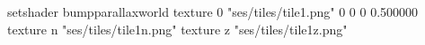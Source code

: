 setshader bumpparallaxworld
texture 0 "ses/tiles/tile1.png" 0 0 0 0.500000
texture n "ses/tiles/tile1n.png"
texture z "ses/tiles/tile1z.png"

